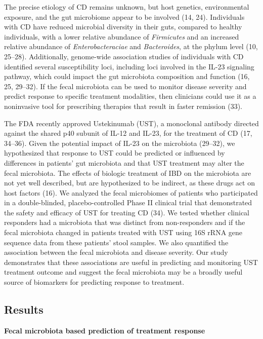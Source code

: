 \documentclass[11pt,]{article}
\begin{document}
The precise etiology of CD remains unknown, but host genetics,
environmental exposure, and the gut microbiome appear to be involved
(14, 24). Individuals with CD have reduced microbial diversity in their
guts, compared to healthy individuals, with a lower relative abundance
of \emph{Firmicutes} and an increased relative abundance of
\emph{Enterobacteraciae} and \emph{Bacteroides}, at the phylum level
(10, 25--28). Additionally, genome-wide association studies of
individuals with CD identified several susceptibility loci, including
loci involved in the IL-23 signaling pathway, which could impact the gut
microbiota composition and function (16, 25, 29--32). If the fecal
microbiota can be used to monitor disease severity and predict response
to specific treatment modalities, then clinicians could use it as a
noninvasive tool for prescribing therapies that result in faster
remission (33).

The FDA recently approved Ustekinumab (UST), a monoclonal antibody
directed against the shared p40 subunit of IL-12 and IL-23, for the
treatment of CD (17, 34--36). Given the potential impact of IL-23 on the
microbiota (29--32), we hypothesized that response to UST could be
predicted or influenced by differences in patients' gut microbiota and
that UST treatment may alter the fecal microbiota. The effects of
biologic treatment of IBD on the microbiota are not yet well described,
but are hypothesized to be indirect, as these drugs act on host factors
(16). We analyzed the fecal microbiomes of patients who participated in
a double-blinded, placebo-controlled Phase II clinical trial that
demonstrated the safety and efficacy of UST for treating CD (34). We
tested whether clinical responders had a microbiota that was distinct
from non-responders and if the fecal microbiota changed in patients
treated with UST using 16S rRNA gene sequence data from these patients'
stool samples. We also quantified the association between the fecal
microbiota and disease severity. Our study demonstrates that these
associations are useful in predicting and monitoring UST treatment
outcome and suggest the fecal microbiota may be a broadly useful source
of biomarkers for predicting response to treatment.

\subsection{Results}\label{results}

\textbf{Fecal microbiota based prediction of treatment response}
\end{document}
